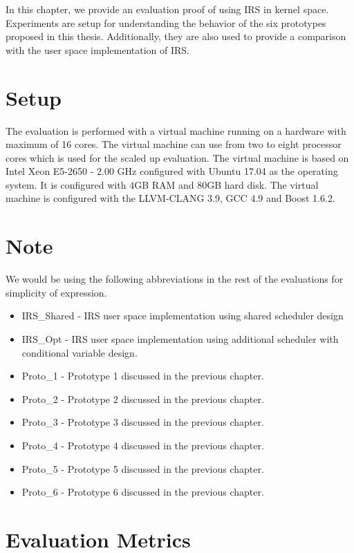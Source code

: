 In this chapter, we provide an evaluation proof of using IRS in kernel space. 
Experiments are setup for understanding the behavior of the six prototypes proposed in this thesis. 
Additionally, they are also used to provide a comparison with the user space implementation of IRS. 

\section{Setup}

The evaluation is performed with a virtual machine running on a hardware with maximum of 16 cores. 
The virtual machine can use from two to eight processor cores which is used for the scaled up evaluation. 
The virtual machine is based on Intel Xeon E5-2650 - 2.00 GHz configured with Ubuntu 17.04 as the operating system. 
It is configured with 4GB RAM and 80GB hard disk. 
The virtual machine is configured with the LLVM-CLANG 3.9, GCC 4.9 and Boost 1.6.2.

\section*{Note}

We would be using the following abbreviations in the rest of the evaluations for simplicity of expression.
\begin{itemize}
\item {IRS\_Shared} - IRS user space implementation using shared scheduler design
\item {IRS\_Opt} - IRS user space implementation using additional scheduler with conditional variable design.
\item {Proto\_1} - Prototype 1 discussed in the previous chapter.
\item {Proto\_2} - Prototype 2 discussed in the previous chapter.
\item {Proto\_3} - Prototype 3 discussed in the previous chapter.
\item {Proto\_4} - Prototype 4 discussed in the previous chapter.
\item {Proto\_5} - Prototype 5 discussed in the previous chapter.
\item {Proto\_6} - Prototype 6 discussed in the previous chapter.

\end{itemize}

\section{Evaluation Metrics}

